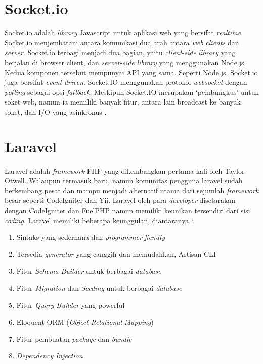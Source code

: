   \section{Socket.io}
	Socket.io adalah \textit{library} Javascript untuk aplikasi web yang bersifat \textit{realtime}. Socket.io menjembatani antara komunikasi dua arah antara \textit{web} \textit{clients} dan \textit{server}. Socket.io terbagi menjadi dua bagian, yaitu \textit{client}-\textit{side} \textit{library} yang berjalan di browser client, dan \textit{server}-\textit{side} \textit{library} yang menggunakan Node.js. Kedua komponen tersebut mempunyai API yang sama. Seperti Node.js, Socket.io juga bersifat \textit{event}-\textit{driven}. Socket.IO menggunakan protokol \textit{websocket} dengan \textit{polling} sebagai opsi \textit{fallback}. Meskipun Socket.IO merupakan ‘pembungkus’ untuk soket web, namun ia memiliki banyak fitur, antara lain broadcast ke banyak soket, dan I/O yang asinkronus \cite{noauthor_socket.io_2016}.
    
    \section{Laravel}
    Laravel adalah \textit{framework} PHP yang dikembangkan pertama kali oleh Taylor Otwell. Walaupun termasuk baru, namun komunitas pengguna laravel sudah berkembang pesat dan mampu menjadi alternatif utama dari sejumlah \textit{framework} besar seperti CodeIgniter dan Yii. Laravel oleh para \textit{developer} disetarakan dengan CodeIgniter dan FuelPHP namun memiliki keunikan tersendiri dari sisi \textit{coding}. Laravel memiliki beberapa keunggulan, diantaranya :
\begin{enumerate}
\item Sintaks yang sederhana dan \textit{programmer}-\textit{fiendly}
\item Tersedia \textit{generator} yang canggih dan memudahkan, Artisan CLI
\item Fitur \textit{Schema} \textit{Builder} untuk berbagai \textit{database}
\item Fitur \textit{Migration} dan \textit{Seeding} untuk berbagai \textit{database}
\item Fitur \textit{Query} \textit{Builder} yang powerful
\item Eloquent ORM (\textit{Object} \textit{Relational} \textit{Mapping})
\item Fitur pembuatan \textit{package} dan \textit{bundle}
\item \textit{Dependency} \textit{Injection} \cite{a}
\end{enumerate}


